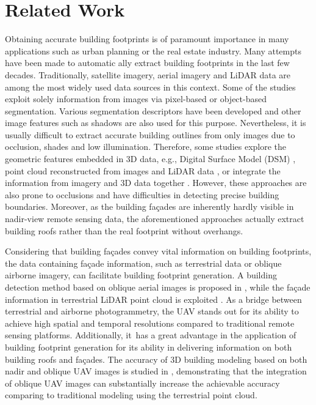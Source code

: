 \section{Related Work}\label{sec:related}
Obtaining accurate building footprints is of paramount importance in many applications such as urban planning or the real estate industry. Many attempts have been made to automatic ally extract building footprints in the last few decades. Traditionally, satellite imagery, aerial imagery and LiDAR data are among the most widely used data sources in this context. Some of the studies exploit solely information from images via pixel-based or object-based segmentation. Various segmentation descriptors \cite{DORNAIKA2016130} have been developed and other image features such as shadows \cite{ok2013exploiting} are also used for this purpose. Nevertheless, it is usually difficult to extract accurate building outlines from only images due to occlusion, shades and low illumination. Therefore, some studies explore the geometric features embedded in 3D data, e.g., Digital Surface Model (DSM) \cite{dini2013delineation}, point cloud reconstructed from images \cite{dai2017building} and LiDAR data \cite{awrangjeb2014automatic}, or integrate the information from imagery and 3D data together \cite{bittner2017building, li2013fusion}. However, these approaches are also prone to occlusions and have difficulties in detecting precise building boundaries. Moreover, as the building fa\c{c}ades are inherently hardly visible in nadir-view remote sensing data, the aforementioned approaches actually extract building roofs rather than the real footprint without overhangs. 

Considering that building fa\c{c}ades convey vital information on building footprints, the data containing fa\c{c}ade information, such as terrestrial data or oblique airborne imagery, can facilitate building footprint generation. A building detection method based on oblique aerial images is proposed in \cite{nex2013building}, while the fa\c{c}ade information in terrestrial LiDAR point cloud is exploited \cite{Hammoudi2009ExtractingBF, yang2013semiautomated}. As a bridge between terrestrial and airborne photogrammetry, the UAV stands out for its ability to achieve high spatial and temporal resolutions compared to traditional remote sensing platforms. Additionally, it~has a great advantage in the application of building footprint generation for its ability in delivering information on both building roofs and fa\c{c}ades. The accuracy of 3D building modeling based on both nadir and oblique UAV images is studied in \cite{vacca2017the}, demonstrating that the integration of oblique UAV images can substantially increase the achievable accuracy comparing to traditional modeling using the terrestrial point cloud.




